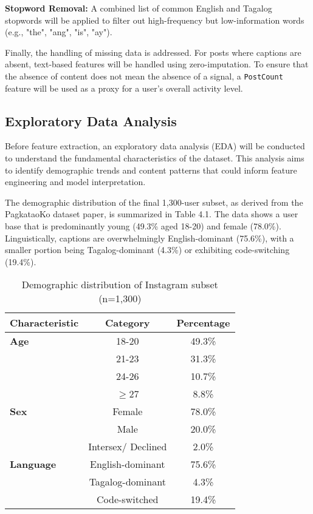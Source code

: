 \textbf{Stopword Removal: } A combined list of common English and Tagalog stopwords will be applied to filter out high-frequency but low-information words (e.g., "the", "ang", "is", "ay").

Finally, the handling of missing data is addressed. For posts where captions are absent, text-based features will be handled using zero-imputation. To ensure that the absence of content does not mean the absence of a signal, a \texttt{PostCount} feature will be used as a proxy for a user's overall activity level.

\subsection{Exploratory Data Analysis}
\label{subsec:eda}

Before feature extraction, an exploratory data analysis (EDA) will be conducted to understand the fundamental characteristics of the dataset. This analysis aims to identify demographic trends and content patterns that could inform feature engineering and model interpretation.

The demographic distribution of the final 1,300-user subset, as derived from the PagkataoKo dataset paper, is summarized in Table 4.1. The data shows a user base that is predominantly young (49.3\% aged 18-20) and female (78.0\%). Linguistically, captions are overwhelmingly English-dominant (75.6\%), with a smaller portion being Tagalog-dominant (4.3\%) or exhibiting code-switching (19.4\%).

\begin{table}[h]
	\centering
	\caption{Demographic distribution of Instagram subset (n=1,300)}
	\label{tab:demo}
	\begin{tabular}{lcc}
		\hline
		\textbf{Characteristic} & \textbf{Category} & \textbf{Percentage} \\ \hline
		\textbf{Age} & 18-20 & 49.3\% \\
		& 21-23 & 31.3\% \\
		& 24-26 & 10.7\% \\
		& $\geq$27 & 8.8\% \\ \hline
		\textbf{Sex} & Female & 78.0\% \\
		& Male & 20.0\% \\
		& Intersex/ Declined & 2.0\% \\ \hline
		\textbf{Language} & English-dominant & 75.6\% \\
		& Tagalog-dominant & 4.3\% \\
		& Code-switched & 19.4\% \\ \hline
	\end{tabular}
\end{table}

